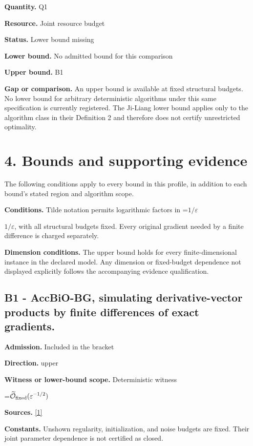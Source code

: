 \documentclass[10pt,a4paper]{article}
\newcommand{\AtlasMath}[1]{\par\begingroup\centering\setbox0=\hbox{$\displaystyle #1$}\ifdim\wd0>1.4\linewidth\typeout{ATLAS WIDE FORMULA: \the\wd0}\fi\ifdim\wd0>\linewidth\resizebox{\linewidth}{!}{\box0}\else\box0\fi\par\endgroup}
\newcommand{\AtlasInlineMath}[1]{\begingroup\setbox0=\hbox{$#1$}\ifdim\wd0>.4\linewidth\endgroup\AtlasMath{#1}\else\endgroup$#1$\fi}
\begin{document}
\textbf{Quantity.} Q1

\textbf{Resource.} Joint resource budget

\textbf{Status.} Lower bound missing

\textbf{Lower bound.} No admitted bound for this comparison

\textbf{Upper bound.} B1

\textbf{Gap or comparison.} An upper bound is available at fixed structural budgets. No lower bound for arbitrary deterministic algorithms under this same specification is currently registered. The Ji-Liang lower bound applies only to the algorithm class in their Definition 2 and therefore does not certify unrestricted optimality.

\section{4. Bounds and supporting evidence}
The following conditions apply to every bound in this profile, in addition to each bound's stated region and algorithm scope.

\textbf{Conditions.} Tilde notation permits logarithmic factors in \AtlasInlineMath{1/\varepsilon}, with all structural budgets fixed. Every original gradient needed by a finite difference is charged separately.

\textbf{Dimension conditions.} The upper bound holds for every finite-dimensional instance in the declared model. Any dimension or fixed-budget dependence not displayed explicitly follows the accompanying evidence qualification.

\subsection{B1 - AccBiO-BG, simulating derivative-vector products by finite differences of exact gradients.}
\textbf{Admission.} Included in the bracket

\textbf{Direction.} upper

\textbf{Witness or lower-bound scope.} Deterministic witness

\AtlasMath{\widetilde{\mathcal{O}}_{\rm fixed}(\varepsilon^{-1/2})}
\textbf{Sources.} \href{https://www.jmlr.org/papers/volume24/21-0949/21-0949.pdf}{[1]}

\textbf{Constants.} Unshown regularity, initialization, and noise budgets are fixed. Their joint parameter dependence is not certified as closed.
\end{document}
